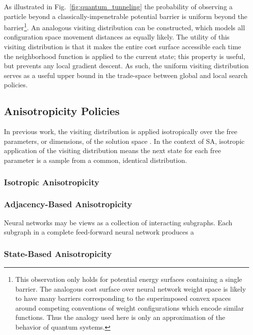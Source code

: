 \documentclass[11pt]{afthesis}
\begin{document}
	As illustrated in Fig.~\ref{fig:quantum_tunneling} the probability of observing a particle beyond a classically-impenetrable potential barrier is uniform beyond the barrier\footnote{This observation only holds for potential energy surfaces containing a single barrier. The analogous cost surface over neural network weight space is likely to have many barriers corresponding to the superimposed convex spaces around competing conventions of weight configurations which encode similar functions. Thus the analogy used here is only an approximation of the behavior of quantum systems.}. An analogous visiting distribution can be constructed, which models all configuration space movement distances as equally likely. The utility of this visiting distribution is that it makes the entire cost surface accessible each time the neighborhood function is applied to the current state; this property is useful, but prevents any local gradient descent. As such, the uniform visiting distribution serves as a useful upper bound in the trade-space between global and local search policies. 
	

	
	\subsection{Anisotropicity Policies}
	
	In previous work, the visiting distribution is applied isotropically over the free parameters, or dimensions, of the solution space \cite{tsallis1996generalizedsimulatedannealing,dallinga2004performancegsa}. In the context of SA, isotropic application of the visiting distribution means the next state for each free parameter is a sample from a common, identical distribution. 
	
	
	\subsubsection{Isotropic Anisotropicity}
	
	
	\subsubsection{Adjacency-Based Anisotropicity}
	
	Neural networks may be views as a collection of interacting subgraphs. Each subgraph in a complete feed-forward neural network produces a 
	
	
	\subsubsection{State-Based Anisotropicity}
	
\end{document}
